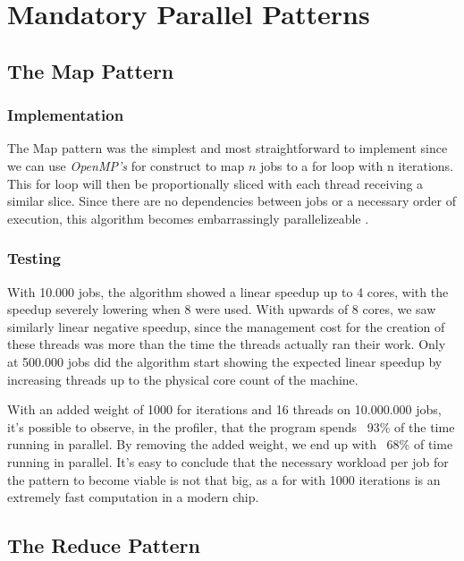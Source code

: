 \documentclass[9pt,journal]{IEEEtran}
\begin{document}
\section{Mandatory Parallel Patterns}

\subsection{The Map Pattern}
\label{map}

\subsubsection{Implementation}

The Map pattern was the simplest and most straightforward to implement since we can use \textit{OpenMP's} for construct to map $ n $ jobs to a for loop with n iterations. This for loop will then be proportionally sliced with each thread receiving a similar slice. Since there are no dependencies between jobs or a necessary order of execution, this algorithm becomes embarrassingly parallelizeable \cite{mccool}.

\subsubsection{Testing}

With 10.000 jobs, the algorithm showed a linear speedup up to 4 cores, with the speedup severely lowering when 8 were used. With upwards of 8 cores, we saw similarly linear negative speedup, since the management cost for the creation of these threads was more than the time the threads actually ran their work. Only at 500.000 jobs did the algorithm start showing the expected linear speedup by increasing threads up to the physical core count of the machine.

With an added weight of 1000 for iterations and 16 threads on 10.000.000 jobs, it's possible to observe, in the profiler, that the program spends ~93\% of the time running in parallel. By removing the added weight, we end up with ~68\% of time running in parallel. It's easy to conclude that the necessary workload per job for the pattern to become viable is not that big, as a for with 1000 iterations is an extremely fast computation in a modern chip.

\subsection{The Reduce Pattern}
\label{reduce}
\end{document}
